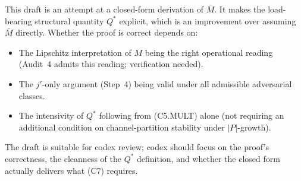 \documentclass{article}
\begin{document}
This draft is an attempt at a closed-form derivation of
$\bar{M}$.  It makes the load-bearing structural quantity $Q^*$
explicit, which is an improvement over assuming $\bar{M}$
directly.  Whether the proof is correct depends on:
\begin{itemize}
\item The Lipschitz interpretation of $M$ being the right
  operational reading (Audit~4 admits this reading; verification
  needed).
\item The $j'$-only argument (Step~4) being valid under all
  admissible adversarial classes.
\item The intensivity of $Q^*$ following from (C5.MULT) alone
  (not requiring an additional condition on channel-partition
  stability under $|P|$-growth).
\end{itemize}

The draft is suitable for codex review; codex should focus on the
proof's correctness, the cleanness of the $Q^*$ definition, and
whether the closed form actually delivers what (C7) requires.
\end{document}
